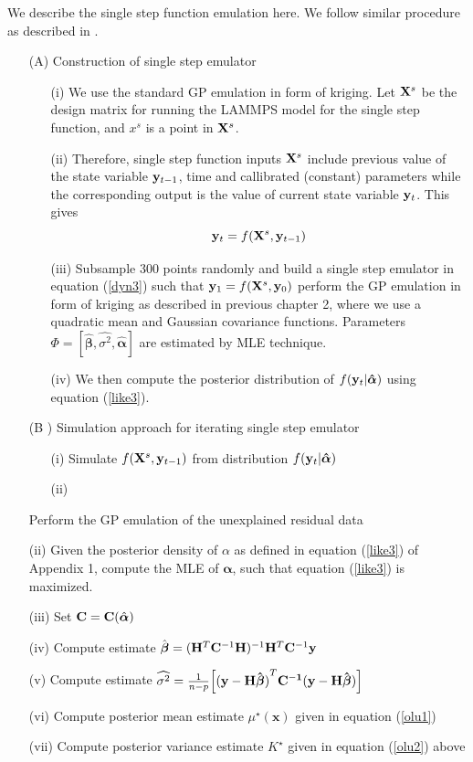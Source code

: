 \documentclass[12pt,titlepage]{report}
\newcommand{\bH}{{\bf H}}
\newcommand{\bC}{{\bf C}}
\newcommand{\bX}{{\bf X}}
\newcommand{\by}{{\bf y}}
\newcommand{\hbbeta}{{\hat{\boldsymbol{\beta}}}}
\newcommand{\balpha}{{\boldsymbol{\alpha}}}
\newcommand{\bhalpha}{{\hat{\boldsymbol{\alpha}}}}
\theoremstyle{definition}
\theoremstyle{remark}
\begin{document}
 
We describe the single step function emulation here. We follow similar procedure as described in \citet{pd12}.
\begin{itemize}
\item[{(A)}] Construction of single step emulator
\begin{itemize}
\item[{(i)}] We use the standard GP emulation in form of kriging. Let $\bX^s$ be the design matrix for running the LAMMPS model for the single step function, and $x^s$ is a point in $\bX^s$. 
\item[{(ii)}]  Therefore, single step function inputs $\bX^s$ include previous value of the state variable $\by_{t-1}$, time and callibrated (constant) parameters while the corresponding output is the value of current state variable $\by_t$. This gives  
\begin{equation}\label{dyn3}
\by_t=f(\bX^s,\by_{t-1})
\end{equation}
\item[{(iii)}] Subsample 300 points randomly and build a single step emulator in equation (\ref{dyn3}) such that $\by_1=f(\bX^s,\by_0)$ perform the GP emulation in form of kriging as described in previous chapter 2, where we use a quadratic mean and Gaussian covariance functions. Parameters  $\Phi=[\hbbeta, \hat{\sigma^2},\bhalpha]$ are estimated by MLE technique.
\item[{(iv)}] We then compute the posterior distribution of $f(\by_t|\boldsymbol{\bhalpha})$ using equation (\ref{like3}).
\end{itemize}

\item[{(B )}] Simulation approach for iterating single step emulator
\begin{itemize}
\item[{(i)}] Simulate $f(\bX^s,\by_{t-1})$ from distribution $f(\by_t|\boldsymbol{\bhalpha})$
\item[{(ii)}]
\end{itemize}

Perform the GP emulation of the unexplained residual data 
\item[{(ii)}] Given the posterior density of $\alpha$ as defined in equation (\ref{like3}) of Appendix 1, compute the MLE of $\balpha$, such that equation (\ref{like3}) is maximized.
\item[{(iii)}] Set $\bC= \bC(\bhalpha)$
\item[{(iv)}] Compute estimate $\hbbeta=(\bH^T\bC^{-1}\bH)^{-1}\bH^T\bC^{-1}\by$
\item[{(v)}] Compute estimate $\widehat{\sigma^2}=\frac{1}{n-p}\Big[\mathbf{(y-H\hat{\boldsymbol \beta})}^T\bf C^{-1}(\bf y-H\hat{\boldsymbol \beta})\Big]$
\item[{(vi)}] Compute posterior mean estimate $\mu^{\star}(\mathbf{x})$ given in equation (\ref{olu1})
\item[{(vii)}] Compute posterior variance estimate $K^{\star}$ given in equation (\ref{olu2}) above
\end{itemize}
\end{document}
